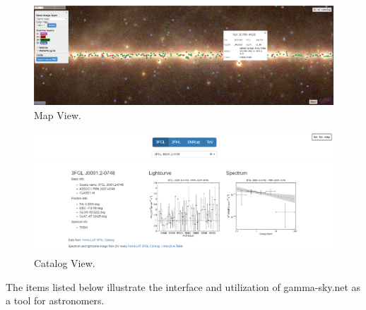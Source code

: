 \begin{figure}[tb]
  \centerline{\includegraphics[width=\textwidth]{figures/mapview_wide}}
  \caption{Map View.}
  \label{fig:mapview}
\end{figure}

\begin{figure}[tb]
  \centerline{\includegraphics[width=\textwidth]{figures/catview_wide_zoom}}
  \caption{Catalog View.}
  \label{fig:catview}
\end{figure}


  The items listed below illustrate the interface and utilization of gamma-sky.net as a tool for astronomers.

